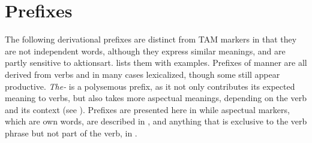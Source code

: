 \section{Prefixes}
\label{sec:VPrefix}
\largerpage
The following derivational prefixes are distinct from TAM markers in that they are not independent words, although they express similar meanings, and are partly sensitive to aktionsart.  lists them with examples.
Prefixes of manner are all derived from verbs and in many cases lexicalized, though some still appear productive. \textit{The-} is a polysemous prefix, as it not only contributes its expected  meaning to verbs, but also takes more aspectual meanings, depending on the verb and its context (see ). Prefixes are presented here in  while aspectual markers, which are own words, are described in  , and anything that is exclusive to the verb phrase but not part of the verb, in .


